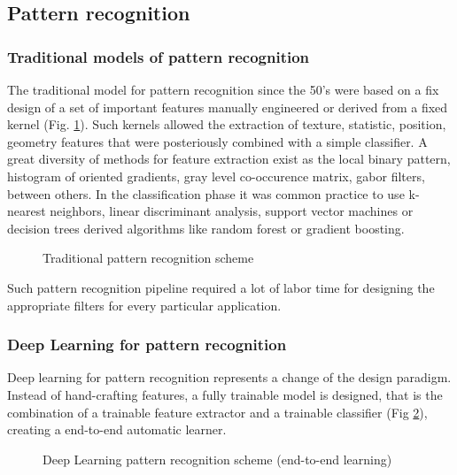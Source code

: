 \subsection{Pattern recognition}

\subsubsection{Traditional models of pattern recognition}

The traditional model for pattern recognition since the 50's were based on a fix design of a set of important features manually engineered or derived from a fixed kernel (Fig. \ref{back:fig:trad_pat_rec}). Such kernels allowed the extraction of texture, statistic, position, geometry features that were posteriously combined with a simple classifier. A great diversity of methods for feature extraction exist as the local binary pattern, histogram of oriented gradients, gray level co-occurence matrix, gabor filters, between others. In the classification phase it was common practice to use k-nearest neighbors, linear discriminant analysis, support vector machines or decision trees derived algorithms like random forest or gradient boosting.

\begin{figure}[!h]
	\centering
	\caption{Traditional pattern recognition scheme}
	\label{back:fig:trad_pat_rec}
\end{figure}

Such pattern recognition pipeline required a lot of labor time for designing the appropriate filters for every particular application.

\subsubsection{Deep Learning for pattern recognition}

Deep learning for pattern recognition represents a change of the design paradigm. Instead of hand-crafting features, a fully trainable model is designed, that is the combination of a trainable feature extractor and a trainable classifier (Fig \ref{back:fig:dl_pat_rec}), creating a end-to-end automatic learner.

\begin{figure}[!h]
	\centering
	\caption[Deep Learning pattern recognition scheme]{Deep Learning pattern recognition scheme (end-to-end learning)}
	\label{back:fig:dl_pat_rec}
\end{figure}

